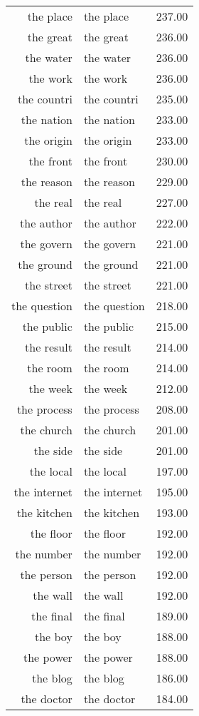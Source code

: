 \begin{table}[ht]
\begin{tabular}{rlr}
  the place & the place & 237.00 \\ 
  the great & the great & 236.00 \\ 
  the water & the water & 236.00 \\ 
  the work & the work & 236.00 \\ 
  the countri & the countri & 235.00 \\ 
  the nation & the nation & 233.00 \\ 
  the origin & the origin & 233.00 \\ 
  the front & the front & 230.00 \\ 
  the reason & the reason & 229.00 \\ 
  the real & the real & 227.00 \\ 
  the author & the author & 222.00 \\ 
  the govern & the govern & 221.00 \\ 
  the ground & the ground & 221.00 \\ 
  the street & the street & 221.00 \\ 
  the question & the question & 218.00 \\ 
  the public & the public & 215.00 \\ 
  the result & the result & 214.00 \\ 
  the room & the room & 214.00 \\ 
  the week & the week & 212.00 \\ 
  the process & the process & 208.00 \\ 
  the church & the church & 201.00 \\ 
  the side & the side & 201.00 \\ 
  the local & the local & 197.00 \\ 
  the internet & the internet & 195.00 \\ 
  the kitchen & the kitchen & 193.00 \\ 
  the floor & the floor & 192.00 \\ 
  the number & the number & 192.00 \\ 
  the person & the person & 192.00 \\ 
  the wall & the wall & 192.00 \\ 
  the final & the final & 189.00 \\ 
  the boy & the boy & 188.00 \\ 
  the power & the power & 188.00 \\ 
  the blog & the blog & 186.00 \\ 
  the doctor & the doctor & 184.00 \\ 

\end{tabular}
\end{table}
